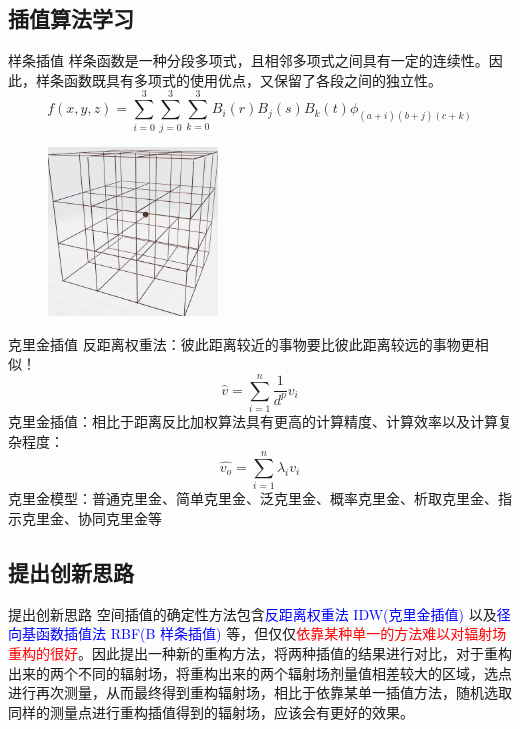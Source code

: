 \documentclass{beamer}
\begin{document}
\subsection{插值算法学习}
\begin{frame}{样条插值}
    样条函数是一种分段多项式，且相邻多项式之间具有一定的连续性。因此，样条函数既具有多项式的使用优点，又保留了各段之间的独立性。
    \begin{equation*}
        f(x,y,z)=\sum_{i=0}^{3}\sum_{j=0}^{3}\sum_{k=0}^{3}B_{i}(r)B_{j}(s)B_{k}(t) \phi_{(a+i)(b+j)(c+k)}
    \end{equation*}
    \begin{figure}
        \centering
        \includegraphics[width=0.4\textwidth]{3D B-splines.png}
    \end{figure}
\end{frame}

\begin{frame}{克里金插值}
    反距离权重法：彼此距离较近的事物要比彼此距离较远的事物更相似！
    \begin{equation*}
        \hat{v} = \sum_{i=1}^{n} \frac{1}{d^{p}}v_{i}
    \end{equation*}
    克里金插值：相比于距离反比加权算法具有更高的计算精度、计算效率以及计算复杂程度：
    \begin{equation*}
        \hat{v_{o}} = \sum_{i=1}^{n}\lambda_{i}v_{i}
    \end{equation*}
    克里金模型：普通克里金、简单克里金、泛克里金、概率克里金、析取克里金、指示克里金、协同克里金等
\end{frame}

\subsection{提出创新思路}
\begin{frame}{提出创新思路}
    空间插值的确定性方法包含\textcolor{blue}{反距离权重法 IDW(克里金插值)} 以及\textcolor{blue}{径向基函数插值法 RBF(B 样条插值)} 等，但仅仅\textcolor{red}{依靠某种单一的方法难以对辐射场重构的很好}。因此提出一种新的重构方法，将两种插值的结果进行对比，对于重构出来的两个不同的辐射场，将重构出来的两个辐射场剂量值相差较大的区域，选点进行再次测量，从而最终得到重构辐射场，相比于依靠某单一插值方法，随机选取同样的测量点进行重构插值得到的辐射场，应该会有更好的效果。
\end{frame}
\end{document}
